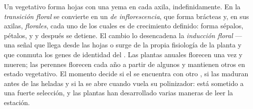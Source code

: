 \begin{definition}\label{def:b2:plant-flowering:transition}
Un  vegetativo forma hojas con una yema en cada
axila, indefinidamente. En la \emph{transición floral} se convierte en un
\emph{ de inflorescencia}, que forma brácteas y, en sus axilas,
\emph{ florales}, cada uno de los cuales es de crecimiento
definido: forma sépalos, pétalos,  y  y después se
detiene. El cambio lo desencadena la \emph{inducción floral} --- una señal
que llega desde las hojas o surge de la propia fisiología de la planta y
que conmuta los genes de identidad del . Las plantas anuales
florecen una vez y mueren; las perennes florecen cada año a partir de
algunos  y mantienen otros en estado vegetativo. El momento
decide si el  se encuentra con otro , si las  maduran
antes de las heladas y si la  se abre cuando vuela su polinizador:
está sometido a una fuerte selección, y las plantas han desarrollado
varias maneras de leer la estación.
\end{definition}


